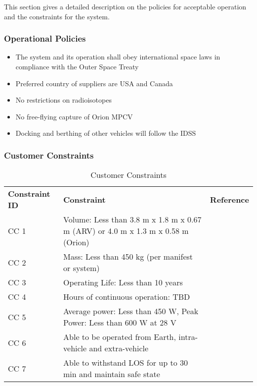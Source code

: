 This section gives a detailed description on the policies for acceptable operation and the constraints for the system.

\subsubsection{Operational Policies}
\label{Operation_Policy}
\begin{itemize}
\item{The system and its operation shall obey international space laws in compliance with the Outer Space Treaty \cite{OST}}
\item{Preferred country of suppliers are \gls{USA} and Canada}
\item{No restrictions on radioisotopes}
\item{No free-flying capture of Orion \gls{MPCV}}
\item{Docking and berthing of other vehicles will follow the \gls{IDSS} \cite{IDSS}}
\end{itemize}


\subsubsection{Customer Constraints}
\begin{table}[H]
\label{cust_constraints}
\caption{Customer Constraints}
\centering
\begin{tabular}{|P{3cm}|P{10cm}|c|}
\hline
\textbf{Constraint ID}	&	\textbf{Constraint}	&	\textbf{Reference}	\\\hhline{|=|=|=|}
CC 1	&
Volume: Less than 3.8 \gls{m} x 1.8 \gls{m} x 0.67 \gls{m} (ARV) or 4.0 \gls{m} x 1.3 \gls{m} x 0.58 \gls{m} (Orion)	&
\cite{RFP}	\\\hline
CC 2	&
Mass: Less than 450 \gls{kg} (per manifest or system)	&
\cite{RFP}	\\\hline
CC 3	&
Operating Life: Less than 10 years	&
\cite{RFP}	\\\hline
CC 4	&
Hours of continuous operation: TBD	&
\cite{RFP}	\\\hline
CC 5	&
Average power: Less than 450 \gls{W}, Peak Power: Less than 600 \gls{W} at 28 \gls{V}	&
\cite{RFP}	\\\hline
CC 6	&
Able to be operated from Earth, intra-vehicle and extra-vehicle	&
\cite{RFP}	\\\hline
CC 7	&
Able to withstand \gls{LOS} for up to 30 \gls{min} and maintain safe state	&
\cite{RFP}	\\\hline
\end{tabular}
\end{table}

